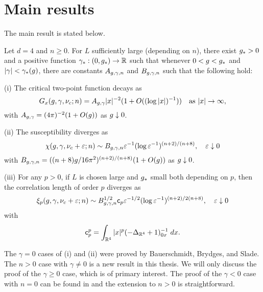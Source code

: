 \section{Main results}

The main result is stated below.

\begin{theorem} \label{thm:mr}
  Let $d = 4$ and $n \ge 0$. For $L$ sufficiently large (depending on $n$),
  there exist $g_* > 0$
  and a positive function $\gamma_* : (0, g_*) \rightarrow {\mathbb R}$
  such that whenever $0 < g < g_*$ and $|\gamma| < \gamma_*(g)$,
  there are constants $A_{g,\gamma,n}$ and $B_{g,\gamma,n}$ such that the following hold:

  \smallskip\noindent
  (i)
  The critical two-point function decays as
  \begin{equation}
    G_x(g,\gamma,\nu_c; n)
        =
    A_{g,\gamma} |x|^{-2} (1 + O((\log |x|)^{-1}))
        \quad
    \text{as $|x|\rightarrow\infty$},
  \end{equation}
  with $A_{g,\gamma} = (4 \pi)^{-2} (1 + O(g))$ as $g \downarrow 0$.

  \smallskip\noindent
  (ii)
  The susceptibility diverges as
  \begin{equation} \label{e:chieps-asympt}
    \chi(g, \gamma, \nu_c + \varepsilon; n)
      \sim B_{g,\gamma,n} \varepsilon^{-1} (\log \varepsilon^{-1})^{(n+2)/(n+8)},
    \quad \varepsilon\downarrow 0
  \end{equation}
  with $B_{g,\gamma,n} = ((n + 8) g / 16\pi^2)^{(n+2)/(n+8)} (1 + O(g))$
  as $g \downarrow 0$.

  \smallskip\noindent
  (iii) For any $p >0$, if $L$ is chosen large and $g_*$ small both depending on $p$,
  then the correlation length of order $p$ diverges as
  \begin{equation} \label{e:xieps-asympt}
    \xi_p(g, \gamma, \nu_c + \varepsilon; n)
     \sim B_{g,\gamma,n}^{1/2} {\sf c}_p \varepsilon^{-1/2} (\log \varepsilon^{-1})^{(n+2)/2(n+8)},
    \quad \varepsilon\downarrow 0
  \end{equation}
  with
  \begin{equation}
  {\sf c}_p^p = \int_{{\mathbb R}^4} |x|^p (-\Delta_{{\mathbb R}^4} + 1)^{-1}_{0x} \; dx.
  \end{equation}
\end{theorem}

The $\gamma = 0$ cases of (i) and (ii) were proved by Bauerschmidt, Brydges, and
Slade. The $n > 0$ case with $\gamma \ne 0$ is a new result in this thesis. We
will only discuss the proof of the $\gamma \ge 0$ case, which is of primary
interest. The proof of the $\gamma < 0$ case with $n = 0$ can be found in
\cite{BSW-saw-sa} and the extension to $n > 0$ is straightforward.

